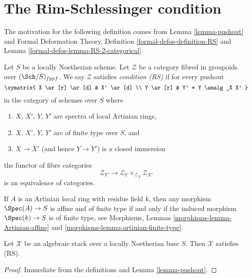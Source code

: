 \section{The Rim-Schlessinger condition}
\label{section-RS}

\noindent
The motivation for the following definition comes from
Lemma \ref{lemma-pushout}
and
Formal Deformation Theory, Definition \ref{formal-defos-definition-RS} and
Lemma \ref{formal-defos-lemma-RS-2-categorical}.

\begin{definition}
\label{definition-RS}
Let $S$ be a locally Noetherian scheme. Let $\mathcal{Z}$ be a category
fibred in groupoids over $(\Sch/S)_{fppf}$. We say $\mathcal{Z}$
satisfies {\it condition (RS)} if for every pushout
$$
\xymatrix{
X \ar[r] \ar[d] & X' \ar[d] \\
Y \ar[r] & Y' = Y \amalg_X X'
}
$$
in the category of schemes over $S$ where
\begin{enumerate}
\item $X$, $X'$, $Y$, $Y'$ are spectra of local Artinian rings,
\item $X$, $X'$, $Y$, $Y'$ are of finite type over $S$, and
\item $X \to X'$ (and hence $Y \to Y'$) is a closed immersion
\end{enumerate}
the functor of fibre categories
$$
\mathcal{Z}_{Y'}
\longrightarrow
\mathcal{Z}_Y \times_{\mathcal{Z}_X} \mathcal{Z}_{X'}
$$
is an equivalence of categories.
\end{definition}

\noindent
If $A$ is an Artinian local ring with residue field $k$, then
any morphism $\Spec(A) \to S$ is affine and of finite type if and
only if the induced morphism $\Spec(k) \to S$ is of finite type, see
Morphisms, Lemmas \ref{morphisms-lemma-Artinian-affine} and
\ref{morphisms-lemma-artinian-finite-type}.

\begin{lemma}
\label{lemma-algebraic-stack-RS}
Let $\mathcal{X}$ be an algebraic stack over a locally Noetherian base
$S$. Then $\mathcal{X}$ satisfies (RS).
\end{lemma}

\begin{proof}
Immediate from the definitions and Lemma \ref{lemma-pushout}.
\end{proof}







